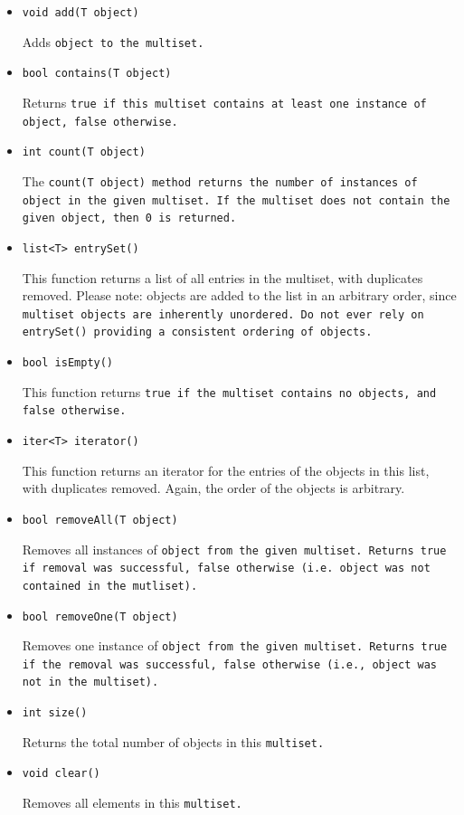 \documentclass{article}
\begin{document}
\begin{itemize}

\item[] \tt void add(T object) \rm

Adds \tt object \rm to the \tt multiset\rm.

\item[] \tt bool contains(T object) \rm

Returns \tt true \rm if this \tt multiset \rm contains at least one instance of
\tt object\rm, \tt false \rm otherwise.

\item[] \tt int count(T object) \rm

The \tt count(T object) \rm method returns the number of instances of \tt object \rm
in the given \tt multiset\rm. If the \tt multiset \rm does not contain the given
object, then \tt 0 \rm is returned. 

\item[] \tt list<T> entrySet() \rm

This function returns a list of all entries in the multiset, with duplicates removed.
Please note: objects are added to the list in an arbitrary order, since \tt multiset
\rm objects are inherently unordered. Do not ever rely on \tt entrySet() \rm 
providing a consistent ordering of objects.

\item[] \tt bool isEmpty() \rm

This function returns \tt true \rm if the \tt multiset \rm contains no objects, and
\tt false \rm otherwise.

\item[] \tt iter<T> iterator() \rm

This function returns an iterator for the entries of the objects in this list,
with duplicates removed. Again, the order of the objects is arbitrary. 

\item[] \tt bool removeAll(T object) \rm

Removes all instances of \tt object \rm from the given \tt multiset\rm. Returns
\tt true \rm if removal was successful, \tt false \rm otherwise (i.e. \tt object \rm
was not contained in the \tt mutliset\rm).

\item[] \tt bool removeOne(T object) \rm

Removes one instance of \tt object \rm from the given \tt multiset\rm. Returns
\tt true \rm if the removal was successful, \tt false \rm otherwise (i.e.,
\tt object \rm was not in the \tt multiset\rm).

\item[] \tt int size() \rm

Returns the total number of objects in this \tt multiset\rm.

\item[] \tt void clear() \rm

Removes all elements in this \tt multiset\rm.

\end{itemize}
\end{document}

